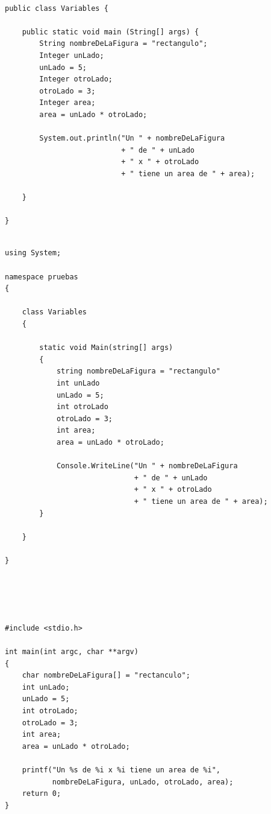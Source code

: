 \documentclass[spanish,12pt,a4paper,final,oneside]{book}
\begin{document}
\begin{lstlisting}[frame=single, caption=lenguaje Java]

public class Variables {
	
    public static void main (String[] args) {
        String nombreDeLaFigura = "rectangulo";
        Integer unLado;
        unLado = 5;
        Integer otroLado;
        otroLado = 3;
        Integer area;
        area = unLado * otroLado;
        
        System.out.println("Un " + nombreDeLaFigura
                           + " de " + unLado
                           + " x " + otroLado 
                           + " tiene un area de " + area);

    }
	
}

\end{lstlisting}

\begin{lstlisting}[frame=single, caption=lenguaje C\#]

using System;

namespace pruebas
{

    class Variables
    {
    
        static void Main(string[] args)
        {
            string nombreDeLaFigura = "rectangulo" 
            int unLado
            unLado = 5;
            int otroLado
            otroLado = 3;
            int area;
            area = unLado * otroLado;
            
            Console.WriteLine("Un " + nombreDeLaFigura 
                              + " de " + unLado
                              + " x " + otroLado 
                              + " tiene un area de " + area);
        }
        
    }
    
}


    
\end{lstlisting}

\begin{lstlisting}[frame=single, caption=lenguaje C]

#include <stdio.h>

int main(int argc, char **argv)
{
    char nombreDeLaFigura[] = "rectanculo";
    int unLado;
    unLado = 5;
    int otroLado;
    otroLado = 3;
    int area;
    area = unLado * otroLado;
    
    printf("Un %s de %i x %i tiene un area de %i",
           nombreDeLaFigura, unLado, otroLado, area);
    return 0;
}
\end{lstlisting}
\end{document}
